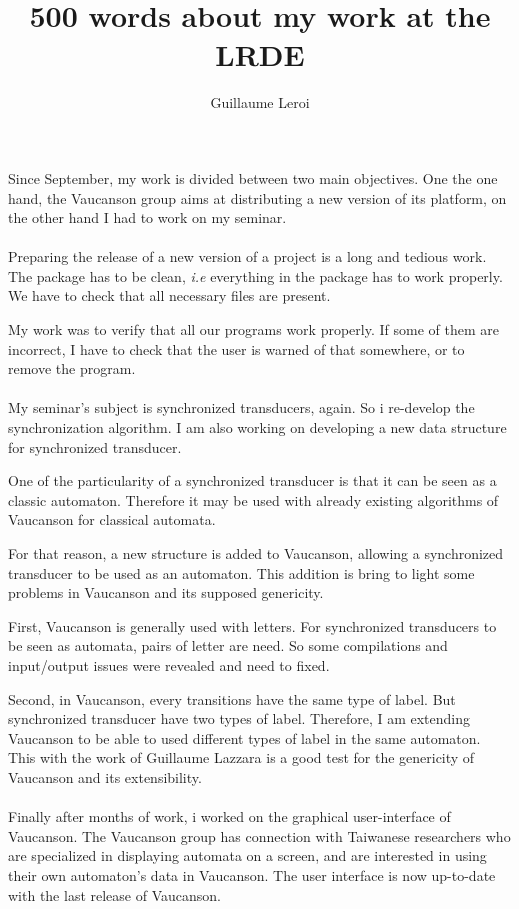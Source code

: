 \documentclass[a4paper, 11pt]{article}
\title{500 words about my work at the LRDE}
\author{Guillaume Leroi}
\begin{document}
\maketitle
\thispagestyle{empty}

Since September, my work is divided between two main objectives. One the one
hand, the Vaucanson group aims at distributing a new version of its platform, on
the other hand I had to work on my seminar.

\paragraph{}

Preparing the release of a new version of a project is a long and tedious
work. The package has to be clean, \emph{i.e} everything in the package has to
work properly. We have to check that all necessary files are present.

My work was to verify that all our programs work properly. If some of them are
incorrect, I have to check that the user is warned of that somewhere, or to
remove the program.

\paragraph{}

My seminar's subject is synchronized transducers, again. So i re-develop the
synchronization algorithm. I am also working on developing a new data structure
for synchronized transducer.

One of the particularity of a synchronized transducer is that it can be seen as
a classic automaton. Therefore it may be used with already existing algorithms
of Vaucanson for classical automata.

For that reason, a new structure is added to Vaucanson, allowing a synchronized
transducer to be used as an automaton. This addition is bring to light some
problems in Vaucanson and its supposed genericity.

First, Vaucanson is generally used with letters. For synchronized transducers to
be seen as automata, pairs of letter are need. So some compilations and
input/output issues were revealed and need to fixed.

Second, in Vaucanson, every transitions have the same type of label. But
synchronized transducer have two types of label. Therefore, I am extending
Vaucanson to be able to used different types of label in the same
automaton. This with the work of Guillaume Lazzara is a good test for the
genericity of Vaucanson and its extensibility.

\paragraph{}

Finally after months of work, i worked on the graphical user-interface of
Vaucanson. The Vaucanson group has connection with Taiwanese researchers who are
specialized in displaying automata on a screen, and are interested in using
their own automaton's data in Vaucanson.
The user interface is now up-to-date with the last release of Vaucanson.
\end{document}
